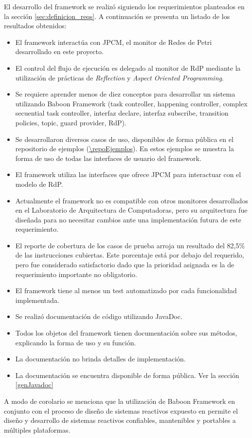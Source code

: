 El desarrollo del framework se realizó siguiendo los requerimientos planteados
en la sección \ref{sec:definicion_reqs}. A continuación se presenta un listado
de los resultados obtenidos:
\begin{itemize}
  \item El framework interactúa con JPCM, el monitor de Redes de Petri
  desarrollado en este proyecto.
  \item El control del flujo de ejecución es delegado al monitor de RdP
  mediante la utilización de prácticas de \textit{Reflection} y \textit{Aspect
  Oriented Programming}.
  \item Se requiere aprender menos de diez conceptos para desarrollar un
  sistema utilizando Baboon Framework (task controller, happening
  controller, complex secuential task controller, interfaz declare, interfaz subscribe, transition policies, topic,
  guard provider, RdP).
  \item Se desarrollaron diversos casos de uso, disponibles de forma pública en
  el repositorio de ejemplos (\url{\repoEjemplos}). En estos ejemplos se muestra
  la forma de uso de todas las interfaces de usuario del framework.
  \item El framework utiliza las interfaces que ofrece JPCM para interactuar con
  el modelo de RdP.
  \item Actualmente el framework no es compatible con otros monitores
  desarrollados en el Laboratorio de Arquitectura de Computadoras, pero su
  arquitectura fue diseñada para no necesitar cambios ante una implementación
  futura de este requerimiento.
  \item El reporte de cobertura de los casos de prueba arroja un resultado del
  82,5\% de las instrucciones cubiertas. Este porcentaje está por debajo del requerido,
  pero fue considerado satisfactorio dado que la prioridad asignada es la de
  requerimiento importante no obligatorio.
  \item El framework tiene al menos un test automatizado por cada funcionalidad
  implementada.
  \item Se realizó documentación de código utilizando JavaDoc.
  \item Todos los objetos del framework tienen documentación sobre sus métodos,
  explicando la forma de uso y su función.
  \item La documentación no brinda detalles de implementación.
  \item La documentación se encuentra disponible de forma pública. Ver la
  sección \ref{genJavadoc}
\end{itemize}

A modo de corolario se menciona que la utilización de Baboon Framework
en conjunto con el proceso de diseño de sistemas reactivos expuesto en
\cite{Bentivegna-Ludemann} permite el diseño y desarrollo de sistemas reactivos
confiables, mantenibles y portables a múltiples plataformas.
